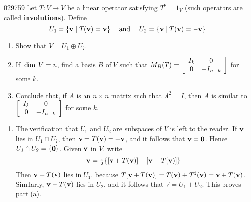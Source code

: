 \begin{example}{}{029759}
Let $T : V \to V$ be a linear operator satisfying $T^{2} = 1_{V}$ (such operators are called \textbf{involutions}). Define
\begin{equation*}
U_1 = \{ \textbf{v} \mid T(\textbf{v}) = \textbf{v} \} \quad \mbox{ and } \quad U_2 = \{ \textbf{v} \mid T(\textbf{v}) = -\textbf{v} \}
\end{equation*}
\begin{enumerate}[label={\alph*.}]
\item Show that $V = U_{1} \oplus U_{2}$.

\item If $\thinspace\operatorname{dim \medspace}V = n$, find a basis $B$ of $V$ such that $M_B(T) = \left[ \begin{array}{cc} I_k & 0 \\ 0 & -I_{n-k} \end{array} \right]$ for some $k$.

\item Conclude that, if $A$ is an $n \times n$ matrix such that $A^{2} = I$, then $A$ is similar to $\left[ \begin{array}{cc} I_k & 0 \\ 0 & -I_{n-k} \end{array} \right]$ for some $k$.

\end{enumerate}

\begin{solution}
\begin{enumerate}[label={\alph*.}]
\item The verification that $U_{1}$ and $U_{2}$ are subspaces of $V$ is left to the reader. If $\textbf{v}$ lies in $U_{1} \cap U_{2}$, then $\textbf{v} = T(\textbf{v}) = -\textbf{v}$, and it follows that $\textbf{v} = \textbf{0}$. Hence $U_{1} \cap U_{2} = \{\textbf{0}\}$. Given $\textbf{v}$ in $V$, write
\begin{equation*}
\textbf{v} = \tfrac{1}{2}\{ [\textbf{v} + T(\textbf{v})] + [\textbf{v} - T(\textbf{v})] \}
\end{equation*}
Then $\textbf{v} + T(\textbf{v})$ lies in $U_{1}$, because $T[\textbf{v} + T(\textbf{v})] = T(\textbf{v}) + T^{2}(\textbf{v}) = \textbf{v} + T(\textbf{v})$. Similarly, $\textbf{v} - T(\textbf{v})$ lies in $U_{2}$, and it follows that $V = U_{1} + U_{2}$. This proves part (a).


\end{enumerate}
\end{solution}
\end{example}
